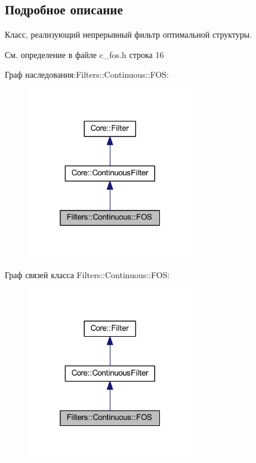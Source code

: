 \subsection{Подробное описание}
Класс, реализующий непрерывный фильтр оптимальной структуры. 

См. определение в файле c\+\_\+fos.\+h строка 16



Граф наследования\+:Filters\+:\+:Continuous\+:\+:F\+OS\+:\nopagebreak
\begin{figure}[H]
\begin{center}
\leavevmode
\includegraphics[width=205pt]{class_filters_1_1_continuous_1_1_f_o_s__inherit__graph}
\end{center}
\end{figure}


Граф связей класса Filters\+:\+:Continuous\+:\+:F\+OS\+:\nopagebreak
\begin{figure}[H]
\begin{center}
\leavevmode
\includegraphics[width=205pt]{class_filters_1_1_continuous_1_1_f_o_s__coll__graph}
\end{center}
\end{figure}


